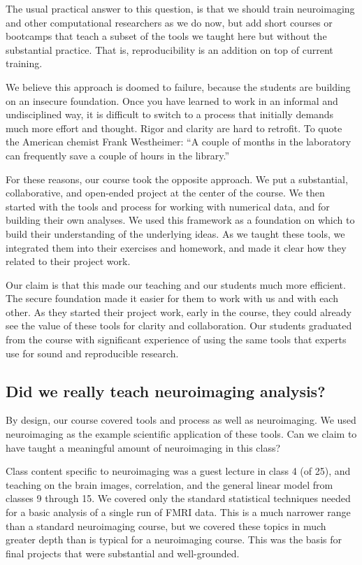 The usual practical answer to this question, is that we should train
neuroimaging and other computational researchers as we do now, but add short
courses or bootcamps that teach a subset of the tools we taught here but
without the substantial practice.  That is, reproducibility is an addition on
top of current training.

We believe this approach is doomed to failure, because the students are
building on an insecure foundation.  Once you have learned to work in an
informal and undisciplined way, it is difficult to switch to a process that
initially demands much more effort and thought.  Rigor and clarity are hard to
retrofit.
To quote the American chemist Frank Westheimer:
``A couple of months in the laboratory can frequently save a couple of hours
in the library.''

For these reasons, our course took the opposite approach.
We put a substantial, collaborative, and open-ended project at the center of
the course.
We then started with the tools and process for working with numerical data, and
for building their own analyses.
We used this framework as a foundation on which to build their understanding of
the underlying ideas.
As we taught these tools, we integrated them into their exercises and homework,
and made it clear how they related to their project work.

Our claim is that this made our teaching and our students much more efficient.
The secure foundation made it easier for them to work with us and with each
other. As they started their project work, early in the course, they could
already see the value of these tools for clarity and collaboration. Our
students graduated from the course with significant experience of using the
same tools that experts use for sound and reproducible research.

\subsection{Did we really teach neuroimaging analysis?}

By design, our course covered tools and process as well as neuroimaging.  We
used neuroimaging as the example scientific application of these tools.  Can
we claim to have taught a meaningful amount of neuroimaging in this class?

Class content specific to neuroimaging was a guest lecture in class 4 (of 25),
and teaching on the brain images, correlation, and the general linear model
from classes 9 through 15.  We covered only the standard
statistical techniques needed for a basic analysis of a single run of FMRI
data.  This is a much narrower range than a standard neuroimaging course, but
we covered these topics in much greater depth than is typical for a
neuroimaging course.  This was the basis for final projects that were
substantial and well-grounded.

